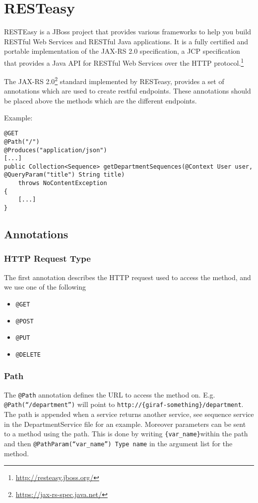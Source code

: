 \newpage
\section{RESTeasy}\label{app:resteasy}
\begin{displayquote}
RESTEasy is a JBoss project that provides various frameworks to help you build RESTful Web Services and RESTful Java applications.
It is a fully certified and portable implementation of the JAX-RS 2.0 specification, a JCP specification that provides a Java API for RESTful Web Services over the HTTP protocol.\footnote{\url{http://resteasy.jboss.org/}}
\end{displayquote}

\noindent
The JAX-RS 2.0\footnote{\url{https://jax-rs-spec.java.net/}} standard implemented by RESTeasy, provides a set of annotations which are used to create restful endpoints. These annotations should be placed above the methods which are the different endpoints.

\bigskip\noindent
Example:
\begin{lstlisting}
@GET
@Path("/")
@Produces("application/json")
[...]
public Collection<Sequence> getDepartmentSequences(@Context User user, @QueryParam("title") String title)
    throws NoContentException
{
    [...]
}
\end{lstlisting}

\subsection{Annotations}

\subsubsection{HTTP Request Type}
The first annotation describes the HTTP request used to access the method, and we use one of the following
\begin{itemize}
    \item \texttt{@GET}
    \item \texttt{@POST}
    \item \texttt{@PUT}
    \item \texttt{@DELETE}
\end{itemize}

\subsubsection{Path}
The \texttt{@Path} annotation defines the URL to access the method on. E.g. \texttt{@Path(``/department'')} will point to \texttt{http://\{giraf-something\}/department}.
The path is appended when a service returns another service, see sequence service in the DepartmentService file for an example.
Moreover parameters can be sent to a method using the path. This is done by writing \texttt{\{var\_name\}}within the path and then \texttt{@PathParam(``var\_name'') Type name} in the argument list for the method.

